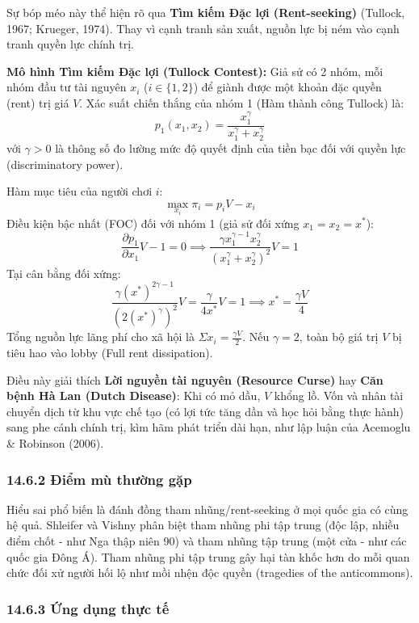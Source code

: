 \documentclass[
]{article}
\begin{document}
Sự bóp méo này thể hiện rõ qua \textbf{Tìm kiếm Đặc lợi (Rent-seeking)}
(Tullock, 1967; Krueger, 1974). Thay vì cạnh tranh sản xuất, nguồn lực
bị ném vào cạnh tranh quyền lực chính trị.

\textbf{Mô hình Tìm kiếm Đặc lợi (Tullock Contest):} Giả sử có 2 nhóm,
mỗi nhóm đầu tư tài nguyên \(x_i\) (\(i \in \{1,2\}\)) để giành được một
khoản đặc quyền (rent) trị giá \(V\). Xác suất chiến thắng của nhóm 1
(Hàm thành công Tullock) là:
\[ p_1(x_1, x_2) = \frac{x_1^\gamma}{x_1^\gamma + x_2^\gamma} \] với
\(\gamma > 0\) là thông số đo lường mức độ quyết định của tiền bạc đối
với quyền lực (discriminatory power).

Hàm mục tiêu của người chơi \(i\): \[ \max_{x_i} \pi_i = p_i V - x_i \]
Điều kiện bậc nhất (FOC) đối với nhóm 1 (giả sử đối xứng
\(x_1 = x_2 = x^*\)):
\[ \frac{\partial p_1}{\partial x_1} V - 1 = 0 \implies \frac{\gamma x_1^{\gamma-1} x_2^\gamma}{(x_1^\gamma + x_2^\gamma)^2} V = 1 \]
Tại cân bằng đối xứng:
\[ \frac{\gamma (x^*)^{2\gamma - 1}}{(2(x^*)^\gamma)^2} V = \frac{\gamma}{4 x^*} V = 1 \implies x^* = \frac{\gamma V}{4} \]
Tổng nguồn lực lãng phí cho xã hội là
\(\Sigma x_i = \frac{\gamma V}{2}\). Nếu \(\gamma = 2\), toàn bộ giá trị
\(V\) bị tiêu hao vào lobby (Full rent dissipation).

Điều này giải thích \textbf{Lời nguyền tài nguyên (Resource Curse)} hay
\textbf{Căn bệnh Hà Lan (Dutch Disease)}: Khi có mỏ dầu, \(V\) khổng lồ.
Vốn và nhân tài chuyển dịch từ khu vực chế tạo (có lợi tức tăng dần và
học hỏi bằng thực hành) sang phe cánh chính trị, kìm hãm phát triển dài
hạn, như lập luận của Acemoglu \& Robinson (2006).

\subsubsection{14.6.2 Điểm mù thường
gặp}\label{ux111iux1ec3m-muxf9-thux1b0ux1eddng-gux1eb7p-11}

Hiểu sai phổ biến là đánh đồng tham nhũng/rent-seeking ở mọi quốc gia có
cùng hệ quả. Shleifer và Vishny phân biệt tham nhũng phi tập trung (độc
lập, nhiều điểm chốt - như Nga thập niên 90) và tham nhũng tập trung
(một cửa - như các quốc gia Đông Á). Tham nhũng phi tập trung gây hại
tàn khốc hơn do mỗi quan chức đối xử người hối lộ như mồi nhện độc quyền
(tragedies of the anticommons).

\subsubsection{14.6.3 Ứng dụng thực
tế}\label{ux1ee9ng-dux1ee5ng-thux1ef1c-tux1ebf-5}
\end{document}
